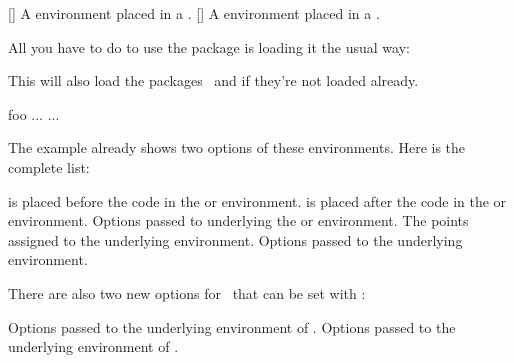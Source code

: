 \documentclass[load-preamble+]{cnltx-doc}
\begin{document}
\begin{environments}
  []
    A  environment placed in a .
  []
    A  environment placed in a .
\end{environments}

All you have to do to use the package is loading it the usual way:
\begin{sourcecode}
  \usepackage{exsheets-listings}
\end{sourcecode}
This will also load the packages \ExSheets\ and  if they're not
loaded already.

\begin{example}
  \begin{lstquestion}[%
      pre=Explain what this piece of \TeX\ code does:,
      listings={style=cnltx}]
    \begingroup\expandafter\expandafter\expandafter\endgroup
    \expandafter\ifx\csname foo\endcsname\relax
    ...
    \else
    ...
    \fi
  \end{lstquestion}
\end{example}

The example already shows two options of these environments.  Here is the
complete list:
\begin{options}
     is placed before the code in the  or
     environment.
     is placed after the code in the  or
     environment.
    Options passed to underlying the  or 
    environment.
    The points assigned to the underlying  environment.
    Options passed to the underlying  environment.
\end{options}

There are also two new options for \ExSheets\ that can be set with
:
\begin{options}
    Options passed to the underlying  environment of
    .
    Options passed to the underlying  environment of
    .
\end{options}
\end{document}
